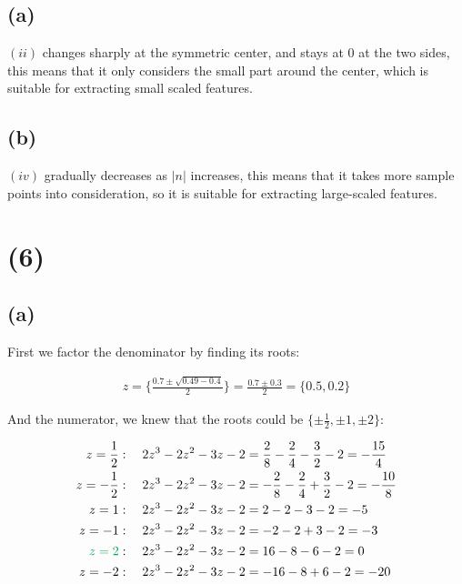 \documentclass{article}
\begin{document}
\subsection*{(a)}

$(ii)$ changes sharply at the symmetric center, and stays at $0$ at the two sides,
this means that it only considers the small part around the center,
which is suitable for extracting small scaled features.

\subsection*{(b)}

$(iv)$ gradually decreases as $|n|$ increases,
this means that it takes more sample points into consideration,
so it is suitable for extracting large-scaled features.

\section*{(6)}

\subsection*{(a)}

First we factor the denominator by finding its roots:

\begin{align*}
    z = \{\frac{0.7 \pm \sqrt{0.49 - 0.4}}{2}\} = \frac{0.7 \pm 0.3}{2} = \{0.5, 0.2\}
\end{align*}

And the numerator, we knew that the roots could be $\{\pm \frac{1}{2}, \pm 1, \pm 2\}$:

\begin{align*}
    z = \frac{1}{2} &: \quad 2z^3 - 2z^2 -3z - 2 = \frac{2}{8} - \frac{2}{4} - \frac{3}{2} - 2 = -\frac{15}{4} \\
    z = -\frac{1}{2} &: \quad 2z^3 - 2z^2 -3z - 2 = -\frac{2}{8} - \frac{2}{4} + \frac{3}{2} - 2 = -\frac{10}{8} \\
    z = 1 &: \quad 2z^3 - 2z^2 -3z - 2 = 2 - 2 - 3 - 2 = -5 \\
    z = -1 &: \quad 2z^3 - 2z^2 -3z - 2 = - 2 - 2 + 3 - 2 = -3 \\
    \textcolor{Green}{z = 2} &: \quad 2z^3 - 2z^2 -3z - 2 = 16 - 8 - 6 - 2 = 0 \\
    z = -2 &: \quad 2z^3 - 2z^2 -3z - 2 = -16 - 8 + 6 - 2 = -20
\end{align*}
\end{document}
